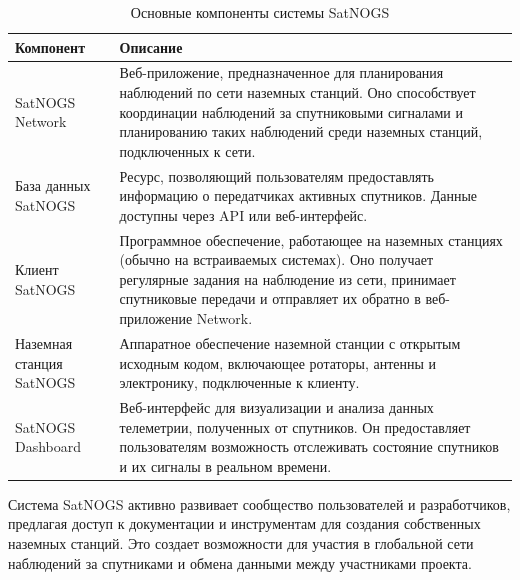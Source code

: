 \documentclass[14pt, a4paper]{bsu}
\begin{document}
\begin{table}[h] \centering \begin{tabular}{|l|p{10cm}|} \hline
		\textbf{Компонент} & \textbf{Описание}
		\\ \hline SatNOGS Network          & Веб-приложение, предназначенное для
		планирования наблюдений по сети наземных станций. Оно способствует
		координации наблюдений за спутниковыми сигналами и планированию таких
		наблюдений среди наземных станций, подключенных к сети.                           \\ \hline База данных
		SatNOGS            & Ресурс, позволяющий пользователям предоставлять информацию о
		передатчиках активных спутников. Данные доступны через API или веб-интерфейс.
		\\ \hline Клиент SatNOGS           & Программное обеспечение, работающее на
		наземных станциях (обычно на встраиваемых системах). Оно получает регулярные
		задания на наблюдение из сети, принимает спутниковые передачи и отправляет их
		обратно в веб-приложение Network.                                                 \\ \hline Наземная станция SatNOGS &
		Аппаратное обеспечение наземной станции с открытым исходным кодом, включающее
		ротаторы, антенны и электронику, подключенные к клиенту.
		\\ \hline SatNOGS Dashboard        & Веб-интерфейс для визуализации и анализа
		данных телеметрии, полученных от спутников. Он предоставляет пользователям
		возможность отслеживать состояние спутников и их сигналы в реальном времени.
		\\ \hline\end{tabular} \caption{Основные компоненты системы SatNOGS}
	\label{tab:satnogs_components} \end{table}

Система SatNOGS активно развивает сообщество пользователей и разработчиков,
предлагая доступ к документации и инструментам для создания собственных
наземных станций. Это создает возможности для участия в глобальной сети
наблюдений за спутниками и обмена данными между участниками проекта.
\end{document}
